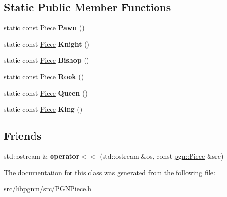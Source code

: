 \subsection*{Static Public Member Functions}
\begin{DoxyCompactItemize}
\item 
\hypertarget{classpgn_1_1Piece_ab53794adcf79e3f58a07f204b361abe1}{
static const \hyperlink{classpgn_1_1Piece}{Piece} {\bfseries Pawn} ()}
\label{classpgn_1_1Piece_ab53794adcf79e3f58a07f204b361abe1}

\item 
\hypertarget{classpgn_1_1Piece_abac50d97af8f97bd01a71c321a7584e1}{
static const \hyperlink{classpgn_1_1Piece}{Piece} {\bfseries Knight} ()}
\label{classpgn_1_1Piece_abac50d97af8f97bd01a71c321a7584e1}

\item 
\hypertarget{classpgn_1_1Piece_a0aca9340499da83c5ea41f009e838fad}{
static const \hyperlink{classpgn_1_1Piece}{Piece} {\bfseries Bishop} ()}
\label{classpgn_1_1Piece_a0aca9340499da83c5ea41f009e838fad}

\item 
\hypertarget{classpgn_1_1Piece_a7baa91f2cb5ac9ac58cd86e0c07ffced}{
static const \hyperlink{classpgn_1_1Piece}{Piece} {\bfseries Rook} ()}
\label{classpgn_1_1Piece_a7baa91f2cb5ac9ac58cd86e0c07ffced}

\item 
\hypertarget{classpgn_1_1Piece_a9790d0faedb98b2b533cd5ae98277c10}{
static const \hyperlink{classpgn_1_1Piece}{Piece} {\bfseries Queen} ()}
\label{classpgn_1_1Piece_a9790d0faedb98b2b533cd5ae98277c10}

\item 
\hypertarget{classpgn_1_1Piece_a9de249670a53a73080fb447ad2d0fdd8}{
static const \hyperlink{classpgn_1_1Piece}{Piece} {\bfseries King} ()}
\label{classpgn_1_1Piece_a9de249670a53a73080fb447ad2d0fdd8}

\end{DoxyCompactItemize}
\subsection*{Friends}
\begin{DoxyCompactItemize}
\item 
\hypertarget{classpgn_1_1Piece_a709edaad3e58acae010080aeb250073b}{
std::ostream \& {\bfseries operator$<$$<$} (std::ostream \&os, const \hyperlink{classpgn_1_1Piece}{pgn::Piece} \&src)}
\label{classpgn_1_1Piece_a709edaad3e58acae010080aeb250073b}

\end{DoxyCompactItemize}


The documentation for this class was generated from the following file:\begin{DoxyCompactItemize}
\item 
src/libpgnm/src/PGNPiece.h\end{DoxyCompactItemize}
